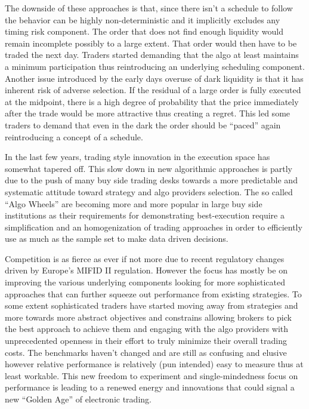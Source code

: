 The downside of these approaches is that, since there isn't a schedule to follow the behavior can be highly non-deterministic and it implicitly excludes any timing risk component. The order that does not find enough liquidity would remain incomplete possibly to a large extent. That order would then have to be traded the next day. Traders started demanding that the algo at least maintains a minimum participation thus reintroducing an underlying scheduling component. Another issue introduced by the early days overuse of dark liquidity is that it has inherent risk of adverse selection. If the residual of a large order is fully executed at the midpoint, there is a high degree of probability that the price immediately after the trade would be more attractive thus creating a regret. This led some traders to demand that even in the dark the order should be ``paced'' again reintroducing a concept of a schedule.


In the last few years, trading style innovation in the execution space has somewhat tapered off. This slow down in new algorithmic approaches is partly due to the push of many buy side trading desks towards a more predictable and systematic attitude toward strategy and algo providers selection. The so called ``Algo Wheels'' are becoming more and more popular in large buy side institutions as their requirements for demonstrating best-execution require a simplification and an homogenization of trading approaches in order to  efficiently use as much as the sample set to make data driven decisions. 


Competition is as fierce as ever if not more due to recent regulatory changes driven by Europe's MIFID II regulation.  However the focus has mostly be on improving the various underlying components looking for more sophisticated approaches that can further squeeze out performance from existing strategies. To some extent sophisticated traders have started moving away from strategies and more towards more abstract objectives and constrains allowing brokers to pick the best approach to achieve them and engaging with the algo providers with unprecedented openness in their effort to truly minimize their overall trading costs. The benchmarks haven't changed and are still as confusing and elusive however relative performance is relatively (pun intended) easy to measure thus at least workable. This new freedom to experiment and single-mindedness focus on performance is leading to a renewed energy and innovations that could signal a new ``Golden Age'' of electronic trading.



